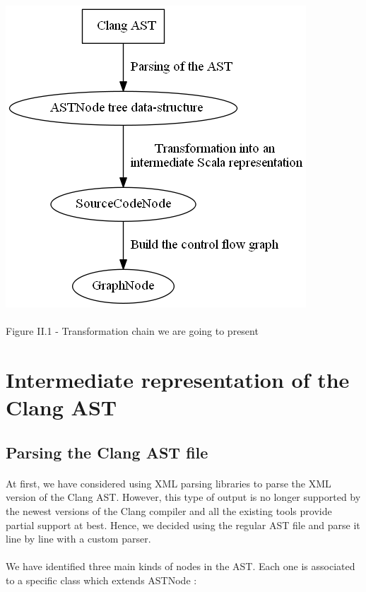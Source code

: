 \documentclass{report}
\begin{document}
\begin{center}
\includegraphics[scale=0.5]{data/transform_chain.png}
~\\~\\Figure II.1 - Transformation chain we are going to present
\end{center}

\section{Intermediate representation of the Clang AST}

\subsection{Parsing the Clang AST file}

\paragraph{}
\hspace{4mm}\textnormal{At first, we have considered using XML parsing libraries to parse the XML version of the Clang AST. However, 
this type of output is no longer supported by the newest versions of the Clang compiler and all the existing tools
provide partial support at best. Hence, we decided using the regular AST file and parse it line by line 
with a custom parser.}

\paragraph{}
\hspace{4mm}\textnormal{We have identified three main kinds of nodes in the AST. Each one is associated to a specific class which extends ASTNode :}
\end{document}
